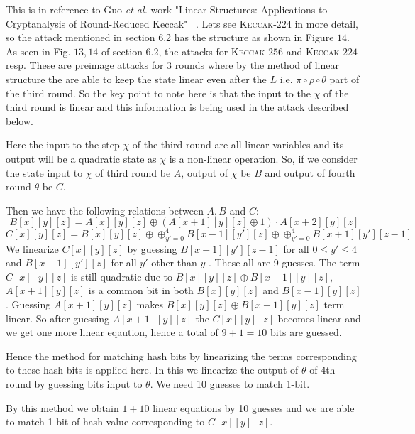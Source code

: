\documentclass[runningheads]{llncs}
\newcommand{\KECCAK}{\mbox{\textsc{Keccak}}}
\newcommand{\etal}{\textit{et al. }}
\begin{document}
    This is in reference to Guo \etal work "Linear Structures: Applications to Cryptanalysis of Round-Reduced Keccak" ~\cite{guo2016linear}. Lets see \KECCAK-$224$ in more detail, so the attack mentioned in section 6.2 has the structure as shown in Figure $14$.
    As seen in Fig. $13, 14$ of section 6.2, the attacks for \KECCAK-$256$ and \KECCAK-$224$ resp. These are preimage attacks for 3 rounds where by the method of linear structure the are able to keep the state linear even after the $L$ i.e. $\pi \circ \rho \circ \theta$ part of the third round. So the key point to note here is that the input to the $\chi$ of the third round is linear and this information is being used in the attack described below.
    \begin{figure}
        \label{fig:boat1}
    \end{figure}
    Here the input to the step $\chi$ of the third round are all linear variables and its output will be a quadratic state as $\chi$ is a non-linear operation.
    So, if we consider the state input to $\chi$ of third round be $A$, output of $\chi$ be $B$ and output of fourth round $\theta$ be $C$.
    
    Then we have the following relations between $A, B$ and $C$: 
    \[
			B[x][y][z] = A[x][y][z] \oplus (A[x+1][y][z] \oplus 1) \cdot A[x+2][y][z]
		\]
		\[
        C[x][y][z] = B[x][y][z] \oplus \oplus_{y' = 0}^{4} B[x-1][y'][z] \oplus \oplus_{y' = 0}^{4} B[x+1][y'][z-1]
    \]
    We linearize $C[x][y][z]$ by guessing $B[x+1][y'][z-1]$ for all $0 \leq y' \leq 4$ and $B[x-1][y'][z]$ for all $y'$ other than $y$ . These all are 9 guesses.
    The term $C[x][y][z]$ is still quadratic due to $B[x][y][z] \oplus B[x-1][y][z]$, $A[x+1][y][z]$ is a common bit in both $B[x][y][z]$ and $B[x-1][y][z]$. Guessing $A[x+1][y][z]$ makes $B[x][y][z] \oplus B[x-1][y][z]$ term linear. So after guessing $A[x+1][y][z]$ the $C[x][y][z]$ becomes linear and we get one more linear eqaution, hence a total of $9+1 = 10$ bits are guessed.

    Hence the method for matching hash bits by linearizing the terms corresponding to these hash bits is applied here.
    In this we linearize the output of $\theta$ of 4th round by guessing bits input to $\theta$. We need 10 guesses to match 1-bit.
    
    By this method we obtain $ 1 + 10 $ linear equations by 10 guesses and we are able to match 1 bit of hash value corresponding to $C[x][y][z]$.
    
\end{document}
